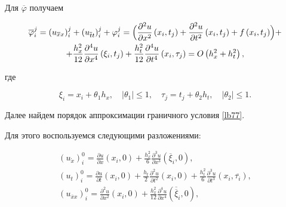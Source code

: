 Для $\overline{\varphi}$ получаем

\begin{multline}

\overline{\varphi}_{i}^{j}=\left(u_{\overline{x}x}\right)_{i}^{j}+

\left (u_{\overline{t}t}\right)_{i}^{j}+\varphi_{i}^{j}=

\Bigl(\frac{\partial^2 u}{\partial x^2}\left(x_i,t_j\right)+\frac{\partial^2 u}{\partial t^2}\left(x_i,t_j\right)+f\left(x_i,t_j\right)\Bigr)+

\\

+\frac{h_x^2}{12}\frac{\partial^4 u}{\partial x^4}\left(\xi_i,t_j\right)+\frac{h_t^2}{12}\frac{\partial^4 u}{\partial t^4}\left(x_i,\tau_j\right)=O\left(h_x^2+h_t^2\right),

\end{multline}

где 

$$\xi_i=x_i+\theta_1 h_x,

\quad  

\left|\theta_1\right|\le 1,

\quad 

\tau_j=t_j+\theta_2 h_t,\quad  \left|\theta_2\right|\le 1.

$$



Далее найдем порядок аппроксимации граничного условия \eqref{lb77}.

Для этого воспользуемся следующими разложениями: 

\begin{gather*}

\left(u_{\mathring{x}}\right)_{i}^{0}=\frac{\partial u}{\partial x}\left(x_i,0\right)+\frac{h_x^2}{6}\frac{\partial^3 u}{\partial x^3} (\overline{\xi}_i, 0 ),

\\

\left(u_{t}\right)_{i}^{0}=\frac{\partial u}{\partial t}\left(x_i,0\right)+\frac{h_t}{2}\frac{\partial^2 u}{\partial t^2}\left(x_i,0\right)+\frac{h_t^2}{6}\frac{\partial^3 u}{\partial t^3} (x_i,\overline{\tau_i} ),

\\

\left(u_{\overline{x}x}\right)_{i}^{0}=\frac{\partial^2 u}{\partial x^2}\left(x_i,0\right)+

\frac{h_x^2}{12}\frac{\partial^4 u}{\partial x^4} (\overline{\overline{\xi}}_i,0 ),

\end{gather*}

